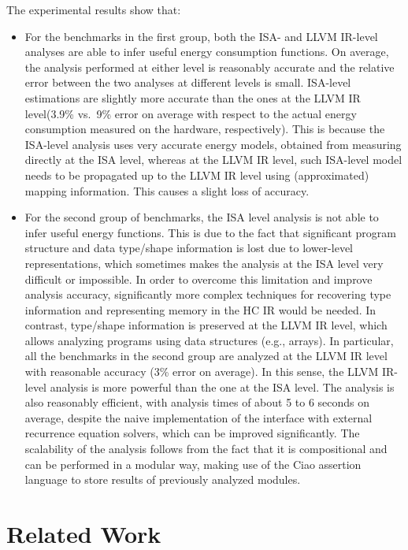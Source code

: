 \documentclass{llncs}
\newcommand{\level}{level\xspace}
\newcommand{\levels}{levels\xspace}
\newcommand{\hcir}{HC IR\xspace}
\newcommand{\llvmir}{LLVM IR\xspace}
\newcommand{\ciao}{Ciao\xspace}
\begin{document}
The experimental results show that:
\begin{itemize}


\item For the benchmarks in the first group, both
  the ISA- and \llvmir-\level analyses are able to infer useful energy
  consumption functions.  On average, the analysis performed at either
  level is reasonably accurate and the relative error between the two
  analyses at different \levels is small.  ISA-\level estimations are
  slightly more accurate than the ones at the \llvmir \level (3.9\%
  vs.\ 9\% 
  error on average with
  respect to the actual energy consumption measured on the hardware, 
  respectively). This is because the ISA-\level analysis uses very
  accurate energy models, obtained from measuring directly at the ISA
  \level, whereas at the \llvmir \level, such ISA-\level model needs
  to be propagated up to the \llvmir \level using (approximated)
  mapping information. This causes a slight loss of accuracy.


\item For the second group of benchmarks, the ISA \level analysis
is not able to infer useful 
energy functions.  This is due to the fact that
significant program structure and data type/shape information is lost
due to lower-level representations, which sometimes makes the analysis
at the ISA \level very difficult or impossible.
In order to overcome this limitation and improve analysis accuracy,
significantly more complex techniques for recovering type information
and representing
memory in the \hcir would be needed.  In contrast, type/shape
information is preserved at the \llvmir \level, which allows analyzing
programs using data structures (e.g., arrays). In particular, all the
benchmarks in the second group are analyzed at the \llvmir \level with
reasonable accuracy (3\%
error on average). 
In this sense, the \llvmir-\level analysis is more powerful than the
one at the ISA \level.  
The analysis is also reasonably efficient, with analysis times of
about 5 to 6 seconds on average, despite the naive implementation of
the interface with external recurrence equation solvers, which can be
improved significantly. The scalability of the analysis follows from
the fact that it is compositional and can be performed in a modular
way, making use of the \ciao assertion language to store results of
previously analyzed modules.

\end{itemize}

\section{Related Work}
\label{sec:related-work}
\end{document}
